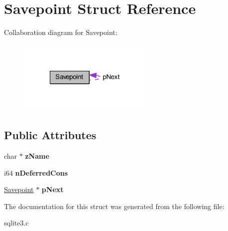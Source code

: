 \hypertarget{struct_savepoint}{\section{Savepoint Struct Reference}
\label{struct_savepoint}
}


Collaboration diagram for Savepoint\-:\nopagebreak
\begin{figure}[H]
\begin{center}
\leavevmode
\includegraphics[width=185pt]{struct_savepoint__coll__graph}
\end{center}
\end{figure}
\subsection*{Public Attributes}
\begin{DoxyCompactItemize}
\item 
\hypertarget{struct_savepoint_a0ba08ea77fcfd93099288375e2e9b1ec}{char $\ast$ {\bfseries z\-Name}}\label{struct_savepoint_a0ba08ea77fcfd93099288375e2e9b1ec}

\item 
\hypertarget{struct_savepoint_ae00dd8f725701d9e31da2edbb0b27435}{i64 {\bfseries n\-Deferred\-Cons}}\label{struct_savepoint_ae00dd8f725701d9e31da2edbb0b27435}

\item 
\hypertarget{struct_savepoint_a8d785c3c0eeb6f0c62ea5391892c78cb}{\hyperlink{struct_savepoint}{Savepoint} $\ast$ {\bfseries p\-Next}}\label{struct_savepoint_a8d785c3c0eeb6f0c62ea5391892c78cb}

\end{DoxyCompactItemize}


The documentation for this struct was generated from the following file\-:\begin{DoxyCompactItemize}
\item 
sqlite3.\-c\end{DoxyCompactItemize}
